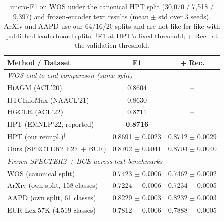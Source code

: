 \documentclass[conference]{IEEEtran}
\begin{document}
\begin{table}[t]
\caption{micro-F1 on WOS under the canonical HPT split (30{,}070 / 7{,}518 /
9{,}397) and frozen-encoder text results (mean $\pm$ std over 3 seeds). ArXiv
and AAPD use our 64/16/20 splits and are not like-for-like with published
leaderboard splits. $^\dagger$F1 at HPT's fixed threshold; + Rec.\ at the
validation threshold.}
\label{tab:wos}
\centering
\footnotesize
\setlength{\tabcolsep}{4pt}
\begin{tabular}{lcc}
\toprule
Method / Dataset & F1 & + Rec. \\
\midrule
\multicolumn{3}{l}{\textit{WOS end-to-end comparison (same split)}} \\
HiAGM (ACL'20)~\cite{zhou2020hiagm} & 0.8604 & -- \\
HTCInfoMax (NAACL'21)~\cite{htcinfomax} & 0.8630 & -- \\
HGCLR (ACL'22)~\cite{hgclr} & 0.8711 & -- \\
HPT (EMNLP'22, reported)~\cite{hpt} & \textbf{0.8716} & -- \\
HPT (our reimpl.)$^\dagger$ & 0.8691 $\pm$ 0.0023 & 0.8712 $\pm$ 0.0029 \\
Ours (SPECTER2 E2E + BCE) & 0.8702 $\pm$ 0.0041 & 0.8704 $\pm$ 0.0040 \\
\midrule
\multicolumn{3}{l}{\textit{Frozen SPECTER2 + BCE across text benchmarks}} \\
WOS (canonical split) & 0.7423 $\pm$ 0.0006 & 0.7462 $\pm$ 0.0002 \\
ArXiv (own split, 158 classes) & 0.7224 $\pm$ 0.0006 & 0.7234 $\pm$ 0.0005 \\
AAPD (own split, 61 classes) & 0.8229 $\pm$ 0.0003 & 0.8232 $\pm$ 0.0003 \\
EUR-Lex 57K (4{,}519 classes) & 0.7812 $\pm$ 0.0006 & 0.7888 $\pm$ 0.0005 \\
\bottomrule
\end{tabular}
\end{table}
\end{document}
